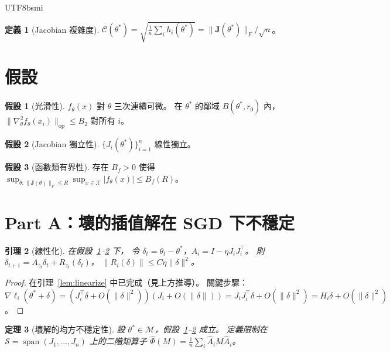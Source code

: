 \documentclass[11pt,a4paper]{article}
\newtheorem{theorem}{定理}
\newtheorem{lemma}[theorem]{引理}
\theoremstyle{definition}
\newtheorem{definition}[theorem]{定義}
\newtheorem{assumption}{假設}
\DeclareMathOperator{\spn}{span}
\newcommand{\cM}{\mathcal{M}}
\newcommand{\cS}{\mathcal{S}}
\newcommand{\cX}{\mathcal{X}}
\newcommand{\cC}{\mathcal{C}}
\newcommand{\bJ}{\mathbf{J}}
\begin{document}
\begin{CJK}{UTF8}{bsmi}
\begin{definition}[Jacobian 複雜度]
  $\cC(\theta^*)=\sqrt{\frac{1}{n}\sum_i h_i(\theta^*)} = \|\bJ(\theta^*)\|_F/\sqrt{n}$。
\end{definition}

\section{假設}

\begin{assumption}[光滑性]\label{A:smooth}
  $f_\theta(x)$ 對 $\theta$ 三次連續可微。
  在 $\theta^*$ 的鄰域 $B(\theta^*,r_0)$ 內，
  $\|\nabla^2_\theta f_\theta(x_i)\|_{\mathrm{op}} \leq B_2$ 對所有 $i$。
\end{assumption}

\begin{assumption}[Jacobian 獨立性]\label{A:indep}
  $\{J_i(\theta^*)\}_{i=1}^n$ 線性獨立。
\end{assumption}

\begin{assumption}[函數類有界性]\label{A:bounded}
  存在 $B_f > 0$ 使得
  $\sup_{\theta:\|\bJ(\theta)\|_F \leq R}\sup_{x\in\cX}|f_\theta(x)| \leq B_f(R)$。
\end{assumption}

\section{Part A：壞的插值解在 SGD 下不穩定}

\begin{lemma}[線性化]\label{lem:lin}
  在假設~\ref{A:smooth}--\ref{A:indep} 下，
  令 $\delta_t=\theta_t-\theta^*$，$A_i=I-\eta J_iJ_i^\top$。
  則 $\delta_{t+1}=A_{z_t}\delta_t+R_{z_t}(\delta_t)$，
  $\|R_i(\delta)\|\leq C\eta\|\delta\|^2$。
\end{lemma}

\begin{proof}
  在引理~\ref{lem:linearize} 中已完成（見上方推導）。
  關鍵步驟：$\nabla\ell_i(\theta^*+\delta)=(J_i^\top\delta+O(\|\delta\|^2))(J_i+O(\|\delta\|))
  =J_iJ_i^\top\delta+O(\|\delta\|^2)=H_i\delta+O(\|\delta\|^2)$。
\end{proof}

\begin{theorem}[壞解的均方不穩定性]\label{thm:bad-unstable}
  設 $\theta^*\in\cM$，假設~\ref{A:smooth}--\ref{A:indep} 成立。
  定義限制在 $\cS=\spn(J_1,\ldots,J_n)$ 上的二階矩算子
  $\hat\Phi(M)=\frac{1}{n}\sum_i\hat{A}_iM\hat{A}_i$。


\end{theorem}
\end{CJK}
\end{document}
